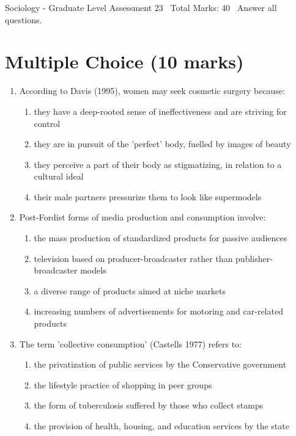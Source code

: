 \documentclass[12pt]{article}
\begin{document}
\begin{center}
Sociology - Graduate Level Assessment 23 \
Total Marks: 40 \
Answer all questions.
\end{center}

\section*{Multiple Choice (10 marks)}
\begin{enumerate}[label=\arabic*.]
\item According to Davis (1995), women may seek cosmetic surgery because:
\begin{enumerate}[label=(\alph*)]
    \item they have a deep-rooted sense of ineffectiveness and are striving for control
    \item they are in pursuit of the 'perfect' body, fuelled by images of beauty
    \item they perceive a part of their body as stigmatizing, in relation to a cultural ideal
    \item their male partners pressurize them to look like supermodels
\end{enumerate}
\item Post-Fordist forms of media production and consumption involve:
\begin{enumerate}[label=(\alph*)]
    \item the mass production of standardized products for passive audiences
    \item television based on producer-broadcaster rather than publisher-broadcaster models
    \item a diverse range of products aimed at niche markets
    \item increasing numbers of advertisements for motoring and car-related products
\end{enumerate}
\item The term 'collective consumption' (Castells 1977) refers to:
\begin{enumerate}[label=(\alph*)]
    \item the privatization of public services by the Conservative government
    \item the lifestyle practice of shopping in peer groups
    \item the form of tuberculosis suffered by those who collect stamps
    \item the provision of health, housing, and education services by the state
\end{enumerate}

\end{enumerate}
\end{document}
